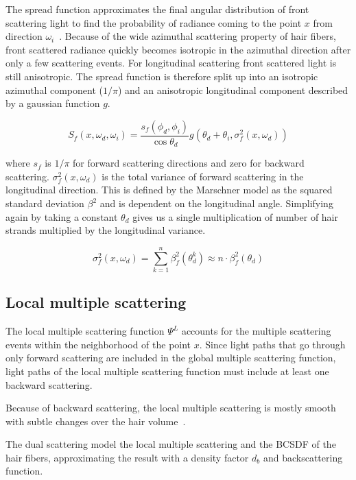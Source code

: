 The spread function approximates the final angular distribution of front scattering light to find the probability of radiance coming to the point $x$ from direction $\omega_i$~\cite{zinke}. Because of the wide azimuthal scattering property of hair fibers, front scattered radiance quickly becomes isotropic in the azimuthal direction after only a few scattering events. For longitudinal scattering front scattered light is still anisotropic. The spread function is therefore split up into an isotropic azimuthal component ($1/\pi$) and an anisotropic longitudinal component described by a gaussian function $g$.

\begin{equation}
\label{dualscattering_Sf}
S_f(x, \omega_d, \omega_i) = \frac{s_f(\phi_d, \phi_i)}{\cos \theta_d} g(\theta_d + \theta_i, \sigma_f^2(x, \omega_d))
\end{equation}

where $s_f$ is $1/\pi$ for forward scattering directions and zero for backward scattering. $\sigma_f^2(x, \omega_d)$ is the total variance of forward scattering in the longitudinal direction. This is defined by the Marschner model as the squared standard deviation $\beta^2$ and is dependent on the longitudinal angle. Simplifying again by taking a constant $\theta_d$ gives us a single multiplication of number of hair strands multiplied by the longitudinal variance.

\begin{equation}
\sigma_f^2(x, \omega_d) = \sum_{k=1}^{n} \beta_f^2(\theta_d^k) \approx n \cdot \beta_f^2(\theta_d)
\end{equation}


\subsection{Local multiple scattering}

The local multiple scattering function $\Psi^L$ accounts for the multiple scattering events within the neighborhood of the point $x$. Since light paths that go through only forward scattering are included in the global multiple scattering function, light paths of the local multiple scattering function must include at least one backward scattering.

Because of backward scattering, the local multiple scattering is mostly smooth with subtle changes over the hair volume~\cite{zinke}.

The dual scattering model the local multiple scattering and the BCSDF of the hair fibers, approximating the result with a density factor $d_b$ and backscattering function.

